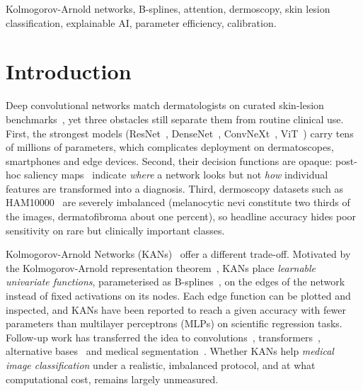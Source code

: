 \documentclass[conference]{IEEEtran}
\begin{document}
\begin{IEEEkeywords}
Kolmogorov-Arnold networks, B-splines, attention, dermoscopy, skin lesion classification, explainable AI, parameter efficiency, calibration.
\end{IEEEkeywords}

\section{Introduction}
Deep convolutional networks match dermatologists on curated skin-lesion benchmarks~\cite{esteva2017dermatologist,codella2019isic}, yet three obstacles still separate them from routine clinical use. First, the strongest models (ResNet~\cite{he2016resnet}, DenseNet~\cite{huang2017densenet}, ConvNeXt~\cite{liu2022convnext}, ViT~\cite{dosovitskiy2021vit}) carry tens of millions of parameters, which complicates deployment on dermatoscopes, smartphones and edge devices. Second, their decision functions are opaque: post-hoc saliency maps~\cite{selvaraju2017gradcam,chattopadhay2018gradcampp} indicate \emph{where} a network looks but not \emph{how} individual features are transformed into a diagnosis. Third, dermoscopy datasets such as HAM10000~\cite{tschandl2018ham10000} are severely imbalanced (melanocytic nevi constitute two thirds of the images, dermatofibroma about one percent), so headline accuracy hides poor sensitivity on rare but clinically important classes.

Kolmogorov-Arnold Networks (KANs)~\cite{liu2025kan,liu2024kan2} offer a different trade-off. Motivated by the Kolmogorov-Arnold representation theorem~\cite{kolmogorov1957}, KANs place \emph{learnable univariate functions}, parameterised as B-splines~\cite{deboor1978splines}, on the edges of the network instead of fixed activations on its nodes. Each edge function can be plotted and inspected, and KANs have been reported to reach a given accuracy with fewer parameters than multilayer perceptrons (MLPs) on scientific regression tasks. Follow-up work has transferred the idea to convolutions~\cite{bodner2024convkan,drokin2024kanconv}, transformers~\cite{yang2025kat}, alternative bases~\cite{li2024fastkan,bozorgasl2024wavkan} and medical segmentation~\cite{li2025ukan}. Whether KANs help \emph{medical image classification} under a realistic, imbalanced protocol, and at what computational cost, remains largely unmeasured.
\end{document}
